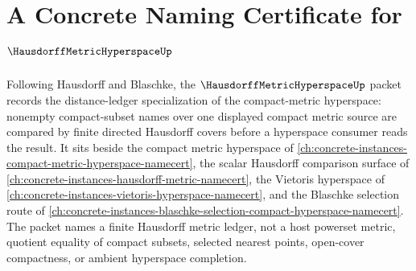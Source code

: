 \chapter{A Concrete Naming Certificate for $\HausdorffMetricHyperspaceUp$}
\label{ch:concrete-instances-hausdorff-metric-hyperspace-namecert}

Following Hausdorff and Blaschke, the $\HausdorffMetricHyperspaceUp$ packet records the distance-ledger specialization of the compact-metric hyperspace: nonempty compact-subset names over one displayed compact metric source are compared by finite directed Hausdorff covers before a hyperspace consumer reads the result. It sits beside the compact metric hyperspace of \autoref{ch:concrete-instances-compact-metric-hyperspace-namecert}, the scalar Hausdorff comparison surface of \autoref{ch:concrete-instances-hausdorff-metric-namecert}, the Vietoris hyperspace of \autoref{ch:concrete-instances-vietoris-hyperspace-namecert}, and the Blaschke selection route of \autoref{ch:concrete-instances-blaschke-selection-compact-hyperspace-namecert}. The packet names a finite Hausdorff metric ledger, not a host powerset metric, quotient equality of compact subsets, selected nearest points, open-cover compactness, or ambient hyperspace completion.

